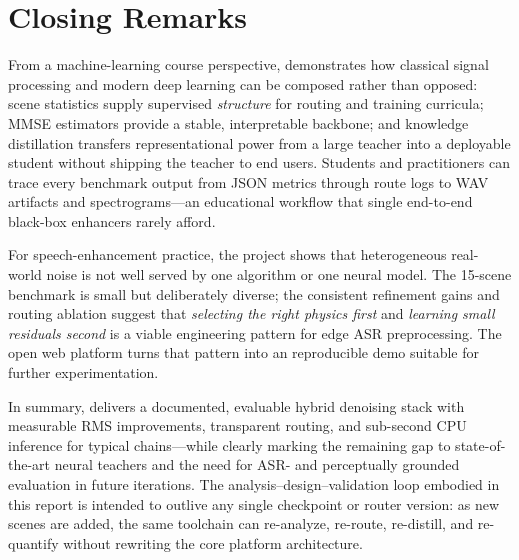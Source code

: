 \section{Closing Remarks}
\label{sec:closing}

From a machine-learning course perspective, \projectshort{} demonstrates how classical signal processing and modern deep learning can be composed rather than opposed: scene statistics supply supervised \emph{structure} for routing and training curricula; MMSE estimators provide a stable, interpretable backbone; and knowledge distillation transfers representational power from a large teacher into a deployable student without shipping the teacher to end users. Students and practitioners can trace every benchmark output from JSON metrics through route logs to WAV artifacts and spectrograms---an educational workflow that single end-to-end black-box enhancers rarely afford.

For speech-enhancement practice, the project shows that heterogeneous real-world noise is not well served by one algorithm or one neural model. The 15-scene benchmark is small but deliberately diverse; the consistent refinement gains and routing ablation suggest that \emph{selecting the right physics first} and \emph{learning small residuals second} is a viable engineering pattern for edge ASR preprocessing. The open web platform turns that pattern into an reproducible demo suitable for further experimentation.

In summary, \projectshort{} delivers a documented, evaluable hybrid denoising stack with measurable RMS improvements, transparent routing, and sub-second CPU inference for typical chains---while clearly marking the remaining gap to state-of-the-art neural teachers and the need for ASR- and perceptually grounded evaluation in future iterations. The analysis--design--validation loop embodied in this report is intended to outlive any single checkpoint or router version: as new scenes are added, the same toolchain can re-analyze, re-route, re-distill, and re-quantify without rewriting the core platform architecture.

